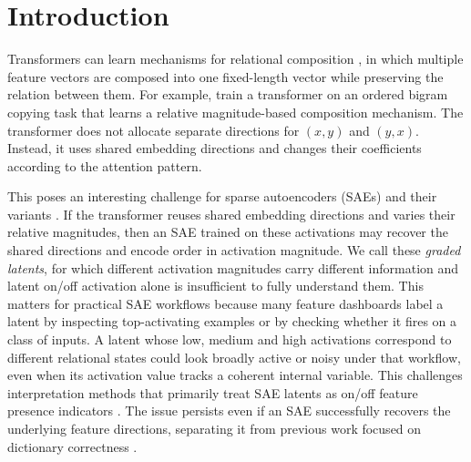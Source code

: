 \section{Introduction}

Transformers can learn mechanisms for relational composition \citep{wattenberg2024relational}, in which multiple feature vectors are composed into one fixed-length vector while preserving the relation between them. For example, \citet{farrell2025order} train a transformer on an ordered bigram copying task that learns a relative magnitude-based composition mechanism. The transformer does not allocate separate directions for $(x,y)$ and $(y,x)$. Instead, it uses shared embedding directions and changes their coefficients according to the attention pattern.

This poses an interesting challenge for sparse autoencoders (SAEs) \citep{bricken2023monosemanticity, huben2024sparse} and their variants \citep{gao2024scaling, bussmann2024batchtopk, rajamanoharan2024jumping, bussmann2025learning, karvonen2025saebench, leask2025inference}. 
If the transformer reuses shared embedding directions and varies their relative magnitudes, then an SAE trained on these activations may recover the shared directions and encode order in activation magnitude.
We call these \emph{graded latents}, for which different activation magnitudes carry different information and latent on/off activation alone is insufficient to fully understand them.
This matters for practical SAE workflows because many feature dashboards label a latent by inspecting top-activating examples or by checking whether it fires on a class of inputs.
A latent whose low, medium and high activations correspond to different relational states could look broadly active or noisy under that workflow, even when its activation value tracks a coherent internal variable.
This challenges interpretation methods that primarily treat SAE latents as on/off feature presence indicators \citep{paulo2025automatically, quirke2025binary}. The issue persists even if an SAE successfully recovers the underlying feature directions, separating it from previous work focused on dictionary correctness \citep{chanin2024absorption, leask2025sparse}.




